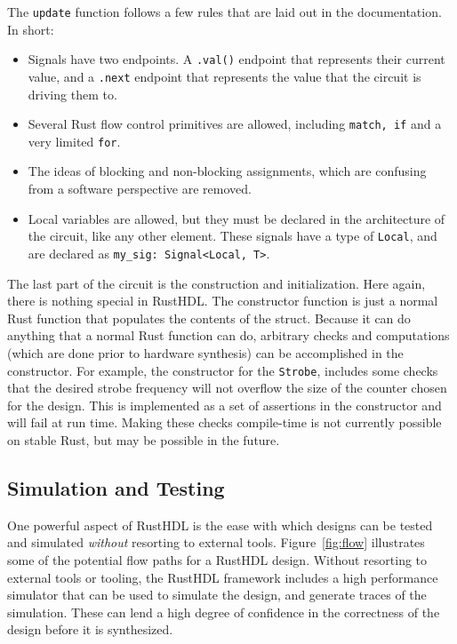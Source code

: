 \documentclass[conference]{IEEEtran}
\begin{document}
The \verb|update| function follows a few rules that are laid out in the documentation.  In short:
\begin{itemize}
  \item Signals have two endpoints.  A \verb|.val()| endpoint that represents their current value, and a \verb|.next| endpoint that represents
    the value that the circuit is driving them to.
  \item Several Rust flow control primitives are allowed, including \verb|match, if| and a very limited \verb|for|.  
  \item The ideas of blocking and non-blocking assignments, which are confusing from a software perspective are removed.  
  \item Local variables are allowed, but they must be declared in the architecture of the circuit, like any other element.
  These signals have a type of \verb|Local|, and are declared as \verb|my_sig: Signal<Local, T>|.
\end{itemize}

The last part of the circuit is the construction and initialization.  Here again, there is nothing special in RustHDL.  The 
constructor function is just a normal Rust function that populates the contents of the struct.  Because it can do anything
that a normal Rust function can do, arbitrary checks and computations (which are done prior to hardware synthesis) can be 
accomplished in the constructor.  For example, the constructor for the \verb|Strobe|, includes some checks that the 
desired strobe frequency will not overflow the size of the counter chosen for the design.  This is implemented as a set 
of assertions in the constructor and will fail at run time.  Making these checks compile-time is not currently possible on
stable Rust, but may be possible in the future.

\subsection{Simulation and Testing}

One powerful aspect of RustHDL is the ease with which designs can be tested and simulated \emph{without} 
resorting to external tools.  Figure~\ref{fig:flow} illustrates some of the potential flow paths for a 
RustHDL design.  Without resorting to external tools or tooling, the RustHDL framework includes a high
performance simulator that can be used to simulate the design, and generate traces of the simulation.  These
can lend a high degree of confidence in the correctness of the design before it is synthesized.
\end{document}
